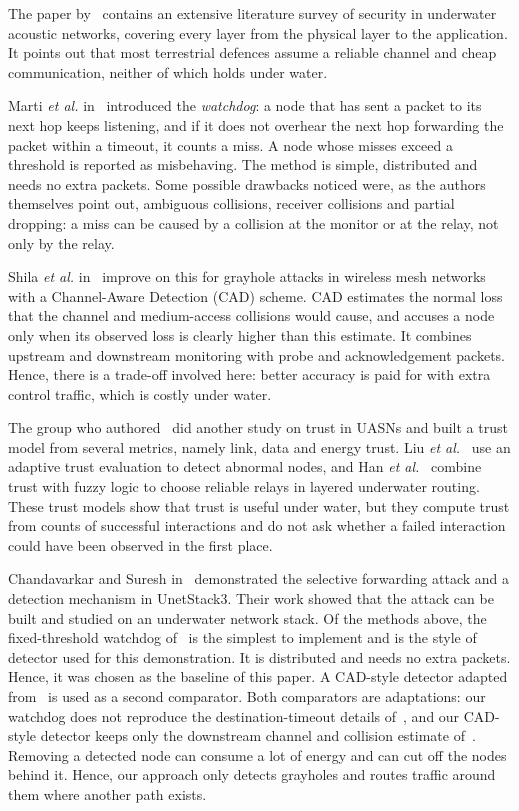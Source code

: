 \documentclass[conference]{IEEEtran}
\begin{document}
The paper by~\cite{jiang} contains an extensive literature survey of security in underwater acoustic networks, covering every layer from the physical layer to the application. It points out that most terrestrial defences assume a reliable channel and cheap communication, neither of which holds under water.

Marti \emph{et al.} in~\cite{marti} introduced the \emph{watchdog}: a node that has sent a packet to its next hop keeps listening, and if it does not overhear the next hop forwarding the packet within a timeout, it counts a miss. A node whose misses exceed a threshold is reported as misbehaving. The method is simple, distributed and needs no extra packets. Some possible drawbacks noticed were, as the authors themselves point out, ambiguous collisions, receiver collisions and partial dropping: a miss can be caused by a collision at the monitor or at the relay, not only by the relay.

Shila \emph{et al.} in~\cite{shila} improve on this for grayhole attacks in wireless mesh networks with a Channel-Aware Detection (CAD) scheme. CAD estimates the normal loss that the channel and medium-access collisions would cause, and accuses a node only when its observed loss is clearly higher than this estimate. It combines upstream and downstream monitoring with probe and acknowledgement packets. Hence, there is a trade-off involved here: better accuracy is paid for with extra control traffic, which is costly under water.

The group who authored~\cite{hanTrust} did another study on trust in UASNs and built a trust model from several metrics, namely link, data and energy trust. Liu \emph{et al.}~\cite{liu} use an adaptive trust evaluation to detect abnormal nodes, and Han \emph{et al.}~\cite{hanRouting} combine trust with fuzzy logic to choose reliable relays in layered underwater routing. These trust models show that trust is useful under water, but they compute trust from counts of successful interactions and do not ask whether a failed interaction could have been observed in the first place.

Chandavarkar and Suresh in~\cite{brc} demonstrated the selective forwarding attack and a detection mechanism in UnetStack3. Their work showed that the attack can be built and studied on an underwater network stack. Of the methods above, the fixed-threshold watchdog of~\cite{marti} is the simplest to implement and is the style of detector used for this demonstration. It is distributed and needs no extra packets. Hence, it was chosen as the baseline of this paper. A CAD-style detector adapted from~\cite{shila} is used as a second comparator. Both comparators are adaptations: our watchdog does not reproduce the destination-timeout details of~\cite{brc}, and our CAD-style detector keeps only the downstream channel and collision estimate of~\cite{shila}. Removing a detected node can consume a lot of energy and can cut off the nodes behind it. Hence, our approach only detects grayholes and routes traffic around them where another path exists.
\end{document}
